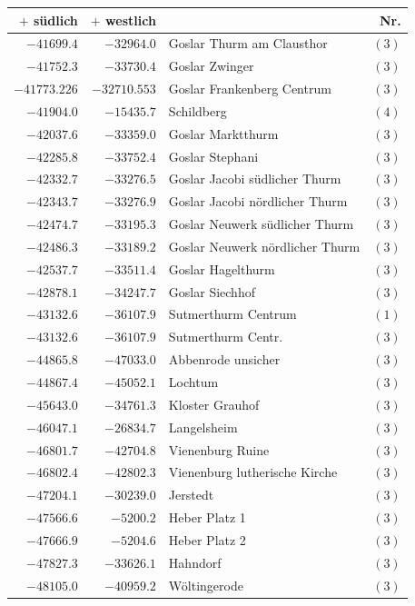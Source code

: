 \clearpage{}%
\begin{center}\begingroup\fontsize{8}{9}\selectfont
\setlength{\tabcolsep}{4pt}
\begin{tabular}{r|r|p{170pt}|r}\hline
\(+\) südlich&\(+\) westlich&&Nr.\\\hline
\(-41699.4\)&\(-32964.0\)&Goslar Thurm am Clausthor&\((3)\)\\
\(-41752.3\)&\(-33730.4\)&Goslar Zwinger&\((3)\)\\
\(-41773.226\)&\(-32710.553\)&Goslar Frankenberg Centrum&\((3)\)\\
\(-41904.0\)&\(-15435.7\)&Schildberg&\((4)\)\\
\(-42037.6\)&\(-33359.0\)&Goslar Marktthurm&\((3)\)\\
\(-42285.8\)&\(-33752.4\)&Goslar Stephani&\((3)\)\\
\(-42332.7\)&\(-33276.5\)&Goslar Jacobi südlicher Thurm&\((3)\)\\
\(-42343.7\)&\(-33276.9\)&Goslar Jacobi nördlicher Thurm&\((3)\)\\
\(-42474.7\)&\(-33195.3\)&Goslar Neuwerk südlicher Thurm&\((3)\)\\
\(-42486.3\)&\(-33189.2\)&Goslar Neuwerk nördlicher Thurm&\((3)\)\\
\(-42537.7\)&\(-33511.4\)&Goslar Hagelthurm&\((3)\)\\
\(-42878.1\)&\(-34247.7\)&Goslar Siechhof&\((3)\)\\
\(-43132.6\)&\(-36107.9\)&Sutmerthurm Centrum&\((1)\)\\
\(-43132.6\)&\(-36107.9\)&Sutmerthurm Centr.&\((3)\)\\
\(-44865.8\)&\(-47033.0\)&Abbenrode unsicher&\((3)\)\\
\(-44867.4\)&\(-45052.1\)&Lochtum&\((3)\)\\
\(-45643.0\)&\(-34761.3\)&Kloster Grauhof&\((3)\)\\
\(-46047.1\)&\(-26834.7\)&Langelsheim&\((3)\)\\
\(-46801.7\)&\(-42704.8\)&Vienenburg Ruine&\((3)\)\\
\(-46802.4\)&\(-42802.3\)&Vienenburg lutherische Kirche&\((3)\)\\
\(-47204.1\)&\(-30239.0\)&Jerstedt&\((3)\)\\
\(-47566.6\)&\(-5200.2\)&Heber Platz 1&\((3)\)\\
\(-47666.9\)&\(-5204.6\)&Heber Platz 2&\((3)\)\\
\(-47827.3\)&\(-33626.1\)&Hahndorf&\((3)\)\\
\(-48105.0\)&\(-40959.2\)&Wöltingerode&\((3)\)\\

\end{tabular}
\end{center}
